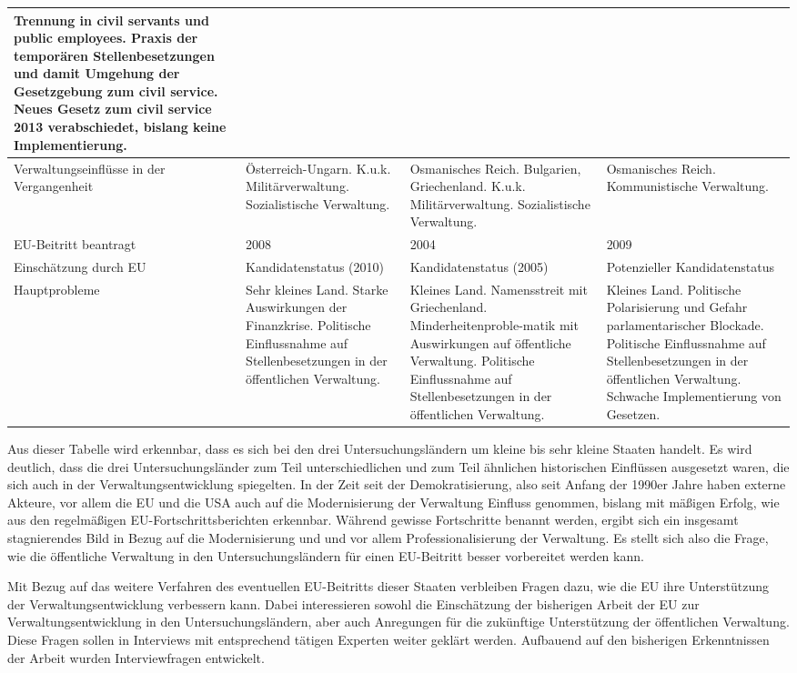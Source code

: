 \begin{footnotesize}
\begin{longtable}[H]{|M{30mm}|C{35mm}|C{35mm}|C{35mm}|}
Trennung in civil servants und public employees. \newline
Praxis der temporären Stellenbesetzungen und damit Umgehung der Gesetzgebung zum civil service.\newline
Neues Gesetz zum civil service 2013 verabschiedet, bislang keine Implementierung.\\\hline
Verwaltungseinflüsse in der Vergangenheit&
Österreich-Ungarn.
K.u.k. Militärverwaltung.
Sozialistische Verwaltung.&
Osmanisches Reich.
Bulgarien, Griechenland. 
K.u.k. Militärverwaltung.
Sozialistische Verwaltung.&
Osmanisches Reich. 
Kommunistische Verwaltung. \\\hline
EU-Beitritt beantragt&
2008&
2004&
2009\\\hline
Einschätzung durch EU&Kandidatenstatus (2010)&
Kandidatenstatus (2005)&
Potenzieller Kandidatenstatus\\\hline
Hauptprobleme&
Sehr kleines Land.
Starke Auswirkungen der Finanzkrise.
Politische Einflussnahme auf Stellenbesetzungen in der öffentlichen Verwaltung.&
Kleines Land.
Namensstreit mit Griechenland.\newline
Minderheitenproble-matik mit Auswirkungen auf öffentliche Verwaltung.
Politische Einflussnahme auf Stellenbesetzungen in der öffentlichen Verwaltung.&
Kleines Land.
Politische Polarisierung und Gefahr parlamentarischer Blockade.\newline
Politische Einflussnahme auf Stellenbesetzungen in der öffentlichen Verwaltung.
Schwache Implementierung von Gesetzen.\\\hline
\end{longtable}
\end{footnotesize}
\vspace{-0,5cm}
Aus dieser Tabelle wird erkennbar, dass es sich bei den drei Untersuchungsländern um kleine bis sehr kleine Staaten handelt. Es wird deutlich, dass die drei Untersuchungsländer zum Teil unterschiedlichen und zum Teil ähnlichen historischen Einflüssen ausgesetzt waren, die sich auch in der Verwaltungsentwicklung spiegelten. In der Zeit seit der Demokratisierung, also seit Anfang der 1990er Jahre haben externe Akteure, vor allem die EU und die USA auch auf die Modernisierung der Verwaltung Einfluss genommen, bislang mit mäßigen Erfolg, wie aus den regelmäßigen EU-Fortschrittsberichten erkennbar. Während gewisse Fortschritte benannt werden, ergibt sich ein insgesamt stagnierendes Bild in Bezug auf die Modernisierung und und vor allem Professionalisierung der Verwaltung. Es stellt sich also die Frage, wie die öffentliche Verwaltung in den Untersuchungsländern für einen EU-Beitritt besser vorbereitet werden kann.\par
Mit Bezug auf das weitere Verfahren des eventuellen EU-Beitritts dieser Staaten verbleiben Fragen dazu, wie die EU ihre Unterstützung der Verwaltungsentwicklung verbessern kann. Dabei interessieren sowohl die Einschätzung der bisherigen Arbeit der EU zur Verwaltungsentwicklung in den Untersuchungsländern, aber auch Anregungen für die zukünftige Unterstützung der öffentlichen Verwaltung. Diese Fragen sollen in Interviews mit entsprechend tätigen Experten weiter geklärt werden. Aufbauend auf den bisherigen Erkenntnissen der Arbeit wurden Interviewfragen entwickelt.

